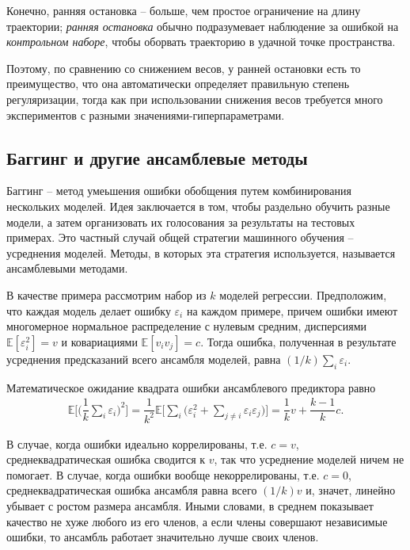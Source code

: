 \documentclass[%
	11pt,
	a4paper,
	utf8,
]{article}
\begin{document}
Конечно, ранняя остановка -- больше, чем простое ограничение на длину траектории; \emph{ранняя остановка} обычно подразумевает наблюдение за ошибкой на \emph{контрольном наборе}, чтобы оборвать траекторию в удачной точке пространства.

Поэтому, по сравнению со снижением весов, у ранней остановки есть то преимущество, что она автоматически определяет правильную степень регуляризации, тогда как при использовании снижения весов требуется много экспериментов с разными значениями-гиперпараметрами.

\subsection{Баггинг и другие ансамблевые методы}

Баггинг -- метод умеьшения ошибки обобщения путем комбинирования нескольких моделей. Идея заключается в том, чтобы раздельно обучить разные модели, а затем организовать их голосования за результаты на тестовых примерах. Это частный случай общей стратегии машинного обучения -- усреднения моделей. Методы, в которых эта стратегия используется, называется ансамблевыми методами.

В качестве примера рассмотрим набор из $ k $ моделей регрессии. Предположим, что каждая модель делает ошибку $ \varepsilon_i $ на каждом примере, причем ошибки имеют многомерное нормальное распределение с нулевым средним, дисперсиями $ \mathbb{E}[\varepsilon_i^2] = v $ и ковариациями $ \mathbb{E}[v_i v_j] = c $. Тогда ошибка, полученная в результате усреднения предсказаний всего ансамбля моделей, равна $ (1 / k) \sum_i \varepsilon_i $.

Математическое ожидание квадрата ошибки ансамблевого предиктора равно
\begin{align*}
	\mathbb{E} \Big[ \big( \dfrac{1}{k} \sum_i \varepsilon_i \big)^2 \Big] = \dfrac{1}{k^2} \mathbb{E} \Big[ \sum_i \big( \varepsilon_i^2 + \sum_{j \neq i} \varepsilon_i \varepsilon_j \big) \Big] = \dfrac{1}{k} v + \dfrac{k - 1}{k} c.
\end{align*}

В случае, когда ошибки идеально коррелированы, т.е. $ c = v $, среднеквадратическая ошибка сводится к $ v $, так что усреднение моделей ничем не помогает. В случае, когда ошибки вообще некоррелированы, т.е. $ c = 0 $, среднеквадратическая ошибка ансамбля равна всего $ (1 / k) v $ и, значет, линейно убывает с ростом размера ансамбля. Иными словами, в среднем показывает качество не хуже любого из его членов, а если члены совершают независимые ошибки, то ансамбль работает значительно лучше своих членов.
\end{document}
